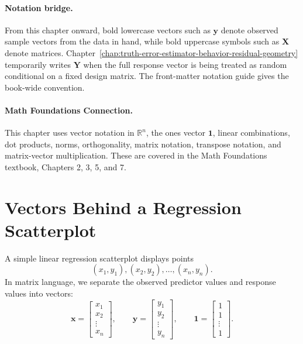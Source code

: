 \paragraph{Notation bridge.}
From this chapter onward, bold lowercase vectors such as \(\mathbf{y}\) denote observed sample vectors from the data in hand, while bold uppercase symbols such as \(\mathbf{X}\) denote matrices.  Chapter~\ref{chap:truth-error-estimator-behavior-residual-geometry} temporarily writes \(\mathbf{Y}\) when the full response vector is being treated as random conditional on a fixed design matrix.  The front-matter notation guide gives the book-wide convention.

\paragraph{Math Foundations Connection.}
This chapter uses vector notation in \(\mathbb{R}^n\), the ones vector \(\mathbf{1}\), linear combinations, dot products, norms, orthogonality, matrix notation, transpose notation, and matrix-vector multiplication.  These are covered in the Math Foundations textbook, Chapters 2, 3, 5, and 7.

\section{Vectors Behind a Regression Scatterplot}

A simple linear regression scatterplot displays points
\begin{equation}
  (x_1,y_1),(x_2,y_2),\ldots,(x_n,y_n).
\end{equation}
In matrix language, we separate the observed predictor values and response values into vectors:
\begin{equation}
  \mathbf{x}=\begin{bmatrix}x_1\\x_2\\ \vdots \\x_n\end{bmatrix},
  \qquad
  \mathbf{y}=\begin{bmatrix}y_1\\y_2\\ \vdots \\y_n\end{bmatrix},
  \qquad
  \mathbf{1}=\begin{bmatrix}1\\1\\ \vdots \\1\end{bmatrix}.
\end{equation}

